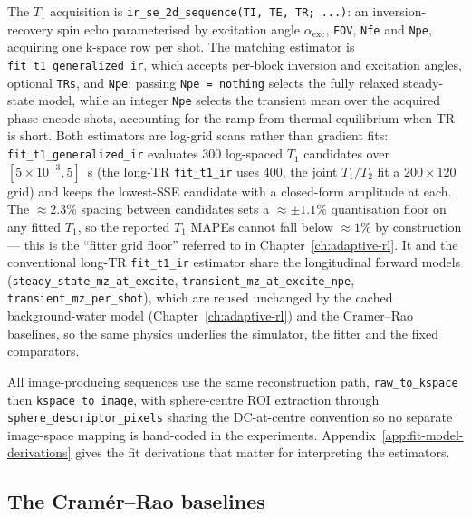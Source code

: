 The $T_1$ acquisition is \texttt{ir\_se\_2d\_sequence(TI, TE, TR; ...)}: an
inversion-recovery spin echo parameterised by excitation angle
$\alpha_\mathrm{exc}$, \texttt{FOV}, \texttt{Nfe} and \texttt{Npe}, acquiring
one k-space row per shot. The matching estimator is
\texttt{fit\_t1\_generalized\_ir}, which accepts per-block inversion and
excitation angles, optional \texttt{TRs}, and \texttt{Npe}: passing
\texttt{Npe = nothing} selects the fully relaxed steady-state model, while an
integer \texttt{Npe} selects the transient mean over the acquired
phase-encode shots, accounting for the ramp from thermal equilibrium when
TR is short. Both estimators are log-grid scans rather than gradient fits:
\texttt{fit\_t1\_generalized\_ir} evaluates 300 log-spaced $T_1$ candidates
over $[5\times10^{-3}, 5]$~s (the long-TR \texttt{fit\_t1\_ir} uses 400, the
joint $T_1/T_2$ fit a $200\times120$ grid) and keeps the lowest-SSE candidate
with a closed-form amplitude at each. The ${\approx}2.3\%$ spacing between
candidates sets a ${\approx}{\pm}1.1\%$ quantisation floor on any fitted $T_1$,
so the reported $T_1$ MAPEs cannot fall below ${\approx}1\%$ by construction ---
this is the ``fitter grid floor'' referred to in
Chapter~\ref{ch:adaptive-rl}. It and the conventional long-TR \texttt{fit\_t1\_ir} estimator
share the longitudinal forward models
(\texttt{steady\_state\_mz\_at\_excite},
\texttt{transient\_mz\_at\_excite\_npe},
\texttt{transient\_mz\_per\_shot}), which are reused unchanged by the cached
background-water model (Chapter~\ref{ch:adaptive-rl}) and the Cramer--Rao
baselines, so the same physics underlies the simulator, the fitter and the
fixed comparators.

All image-producing sequences use the same reconstruction path,
\texttt{raw\_to\_kspace} then \texttt{kspace\_to\_image}, with sphere-centre
ROI extraction through \texttt{sphere\_descriptor\_pixels} sharing the
DC-at-centre convention so no separate image-space mapping is hand-coded in
the experiments. Appendix~\ref{app:fit-model-derivations} gives the fit
derivations that matter for interpreting the estimators.

\subsection{The Cramér--Rao baselines}
\label{sec:crlb-baselines}

